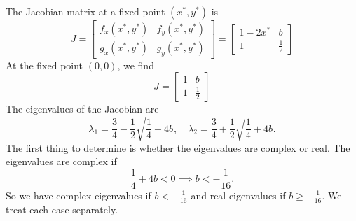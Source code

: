 \documentclass{book}
\begin{document}
The Jacobian matrix 
at a fixed point $(x^*,y^*)$ is
\begin{equation}
   J = \begin{bmatrix}
          f_x(x^*,y^*) & f_y(x^*,y^*) \\
	  g_x(x^*,y^*) & g_y(x^*,y^*) 
       \end{bmatrix}
     = \begin{bmatrix}
          1-2x^* & b \\
	   1    & \frac{1}{2}
       \end{bmatrix}
\end{equation}
At the fixed point $(0,0)$, we find
\begin{equation}
  J = \begin{bmatrix}
          1 & b \\
	  1 & \frac{1}{2}
      \end{bmatrix}
\end{equation}
The eigenvalues of the Jacobian are
\begin{equation}
  \lambda_1 = \frac{3}{4} - \frac{1}{2} \sqrt{\frac{1}{4}+4b}, \quad
  \lambda_2 = \frac{3}{4} + \frac{1}{2} \sqrt{\frac{1}{4}+4b}.
\label{eqn:exeigvals}
\end{equation}
The first thing to determine is whether the eigenvalues are
complex or real.  The eigenvalues are complex if
\begin{equation}
  \frac{1}{4} + 4b < 0 \implies b < -\frac{1}{16}.
\end{equation}
So we have complex eigenvalues if $b < -\frac{1}{16}$ and real
eigenvalues if $b \ge -\frac{1}{16}$.
We treat each case separately.
\end{document}
